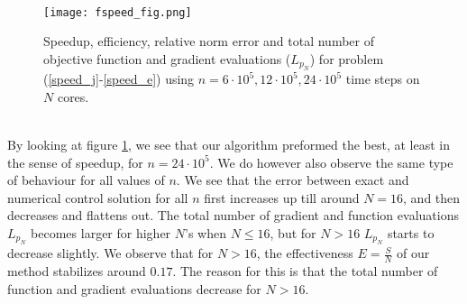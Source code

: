 \\
\begin{figure}[!h]
\centering
\texttt{[image: fspeed\_fig.png]}
\centering
\caption{Speedup, efficiency, relative norm error and total number of objective function and gradient evaluations  ($L_{p_N}$) for problem (\ref{speed_j}-\ref{speed_e}) using $n=6\cdot 10^5,12\cdot 10^5,24\cdot 10^5$ time steps on $N$ cores. }
\label{speed_fig1}
\end{figure}
\\
By looking at figure \ref{speed_fig1}, we see that our algorithm preformed the best, at least in the sense of speedup, for $n=24\cdot 10^5$. We do however also observe the same type of behaviour for all values of $n$. We see that the error between exact and numerical control solution for all $n$ first increases up till around $N=16$, and then decreases and flattens out. The total number of gradient and function evaluations $L_{p_N}$ becomes larger for higher $N$'s when $N\leq 16$, but for $N>16$ $L_{p_N}$ starts to decrease slightly. We observe that for $N>16$, the effectiveness $E=\frac{S}{N}$ of our method stabilizes around $0.17$. The reason for this is that the total number of function and gradient evaluations decrease for $N>16$.  
